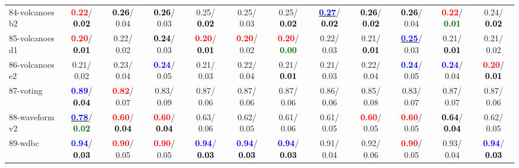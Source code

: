 \begin{table}[h]
\begin{center}
{\begin{tabular}{lc|c|c|c|c|c|c|c|c|c|c}
84-volcanoes b2 & \textcolor{red}{\textbf{  0.22}}/\textcolor{black}{\textbf{  0.02}} & \textcolor{black}{\textbf{  0.26}}/  0.04 & \textcolor{black}{\textbf{  0.26}}/  0.03 &   0.25/\textcolor{black}{\textbf{  0.02}} &   0.25/  0.03 &   0.25/\textcolor{black}{\textbf{  0.02}} & \underline{\textcolor{blue}{\textbf{  0.27}}}/\textcolor{black}{\textbf{  0.02}} & \textcolor{black}{\textbf{  0.26}}/\textcolor{black}{\textbf{  0.02}} & \textcolor{black}{\textbf{  0.26}}/  0.04 & \textcolor{red}{\textbf{  0.22}}/\textcolor{darkgreen}{\textbf{  0.01}} &   0.24/\textcolor{black}{\textbf{  0.02}} \\
85-volcanoes d1 & \textcolor{red}{\textbf{  0.20}}/\textcolor{black}{\textbf{  0.01}} &   0.22/  0.02 & \textcolor{black}{\textbf{  0.24}}/  0.03 & \textcolor{red}{\textbf{  0.20}}/\textcolor{black}{\textbf{  0.01}} & \textcolor{red}{\textbf{  0.20}}/  0.02 & \textcolor{red}{\textbf{  0.20}}/\textcolor{darkgreen}{\textbf{  0.00}} &   0.22/  0.03 &   0.21/\textcolor{black}{\textbf{  0.01}} & \underline{\textcolor{blue}{\textbf{  0.25}}}/  0.03 &   0.21/\textcolor{black}{\textbf{  0.01}} &   0.21/  0.02 \\ \hline
86-volcanoes e2 &   0.21/  0.02 &   0.23/  0.04 & \textcolor{blue}{\textbf{  0.24}}/  0.05 &   0.21/  0.03 &   0.22/  0.04 &   0.21/\textcolor{black}{\textbf{  0.01}} &   0.21/  0.03 &   0.22/  0.04 & \textcolor{blue}{\textbf{  0.24}}/  0.05 & \textcolor{blue}{\textbf{  0.24}}/  0.04 & \textcolor{red}{\textbf{  0.20}}/\textcolor{black}{\textbf{  0.01}} \\
87-voting & \textcolor{blue}{\textbf{  0.89}}/\textcolor{black}{\textbf{  0.04}} & \textcolor{red}{\textbf{  0.82}}/  0.07 &   0.83/  0.09 &   0.87/  0.06 &   0.87/  0.06 &   0.87/  0.06 &   0.86/  0.06 &   0.85/  0.08 &   0.83/  0.07 &   0.87/  0.07 &   0.87/  0.06 \\
88-waveform v2 & \underline{\textcolor{blue}{\textbf{  0.78}}}/\textcolor{darkgreen}{\textbf{  0.02}} & \textcolor{red}{\textbf{  0.60}}/\textcolor{black}{\textbf{  0.04}} & \textcolor{red}{\textbf{  0.60}}/\textcolor{black}{\textbf{  0.04}} &   0.63/  0.06 &   0.62/  0.05 &   0.61/  0.06 &   0.61/  0.05 & \textcolor{red}{\textbf{  0.60}}/  0.05 & \textcolor{red}{\textbf{  0.60}}/  0.05 & \textcolor{black}{\textbf{  0.64}}/\textcolor{black}{\textbf{  0.04}} &   0.62/  0.05 \\
89-wdbc & \textcolor{blue}{\textbf{  0.94}}/\textcolor{black}{\textbf{  0.03}} & \textcolor{red}{\textbf{  0.90}}/  0.05 & \textcolor{red}{\textbf{  0.90}}/  0.05 & \textcolor{blue}{\textbf{  0.94}}/\textcolor{black}{\textbf{  0.03}} & \textcolor{blue}{\textbf{  0.94}}/\textcolor{black}{\textbf{  0.03}} & \textcolor{blue}{\textbf{  0.94}}/\textcolor{black}{\textbf{  0.03}} &   0.91/  0.04 &   0.92/  0.06 & \textcolor{red}{\textbf{  0.90}}/  0.05 &   0.93/  0.04 & \textcolor{blue}{\textbf{  0.94}}/\textcolor{black}{\textbf{  0.03}} \\

\end{tabular}}
\end{center}
\end{table}
